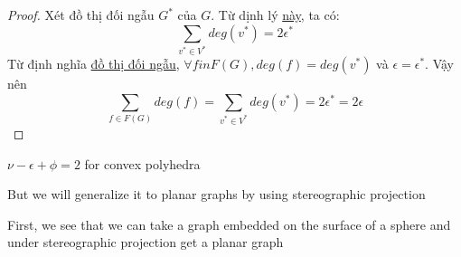 \begin{proof}
    Xét đồ thị đối ngẫu $G^*$ của $G$. Từ dịnh lý \hyperref[thr:v2e]{này}, ta có:
    $$\sum_{v^* \in V^*}deg(v^*) = 2\epsilon^*$$
    Từ định nghĩa \hyperref[def:dualgraph]{đồ thị đối ngẫu}, $\forall f in F(G), deg(f)=deg(v^*)$ và $\epsilon = \epsilon^*$. Vậy nên
    $$\sum_{f \in F(G)}deg(f) = \sum_{v^* \in V^*}deg(v^*) = 2\epsilon^* = 2\epsilon$$
\end{proof}
\begin{theorem}
    $\nu -\epsilon+\phi=2$ for convex polyhedra
\end{theorem}
But we will generalize it to planar graphs by using stereographic projection

First, we see that we can take a graph embedded on the surface of a sphere and under stereographic projection get a planar graph \\





